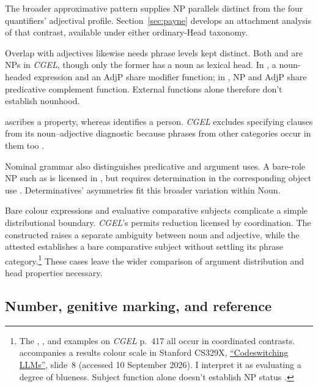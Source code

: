 \documentclass[12pt]{article}
\begin{document}
The broader approximative pattern supplies NP parallels distinct from the four quantifiers' adjectival profile. Section~\ref{sec:payne} develops an attachment analysis of that contrast, available under either ordinary-Head taxonomy.

Overlap with adjectives likewise needs phrase levels kept distinct. Both  and  are NPs in \textit{CGEL}, though only the former has a noun as lexical head. In , a noun-headed expression and an AdjP share modifier function; in , NP and AdjP share predicative complement function. External functions alone therefore don't establish nounhood.

 ascribes a property, whereas  identifies a person. \textit{CGEL} excludes specifying  clauses from its noun--adjective diagnostic because phrases from other categories occur in them too \citep[536]{huddleston2002}.

Nominal grammar also distinguishes predicative and argument uses. A bare-role NP such as  is licensed in , but requires determination in the corresponding object use  \citep[328]{huddleston2002}. Determinatives' asymmetries fit this broader variation within Noun.

Bare colour expressions and evaluative comparative subjects complicate a simple distributional boundary. \textit{CGEL}'s  permits reduction licensed by coordination. The constructed  raises a separate ambiguity between noun and adjective, while the attested  establishes a bare comparative subject without settling its phrase category.\footnote{The , , and  examples on \textit{CGEL} p.~417 all occur in coordinated contrasts.  accompanies a results colour scale in Stanford CS329X, \href{https://web.stanford.edu/class/cs329x/slides/Lecture12_B_Codeswitching\%20LLMs.pdf}{\enquote{Codeswitching LLMs}}, slide~8 (accessed 10 September 2026). I interpret it as evaluating a degree of blueness. Subject function alone doesn't establish NP status \citep[236]{huddleston2002}.} These cases leave the wider comparison of argument distribution and head properties necessary.

\subsection{Number, genitive marking, and reference}\label{sec:inflection}
\end{document}
